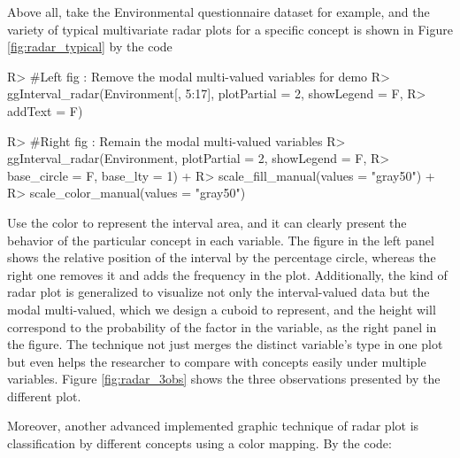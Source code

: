 \documentclass[article]{jss}
\begin{document}
Above all, take the Environmental questionnaire dataset for example, and the variety of typical multivariate radar plots for a specific concept is shown in Figure \ref{fig:radar_typical} by the code

\begin{CodeChunk}
\begin{CodeInput}
R> #Left fig : Remove the modal multi-valued variables for demo
R> ggInterval_radar(Environment[, 5:17], plotPartial = 2, showLegend = F, 
R>                  addText = F) 

R> #Right fig : Remain the modal multi-valued variables
R> ggInterval_radar(Environment, plotPartial = 2, showLegend = F,
R>                  base_circle = F, base_lty = 1) +
R>   scale_fill_manual(values = "gray50") +
R>   scale_color_manual(values = "gray50") 
\end{CodeInput}
\end{CodeChunk}

Use the color to represent the interval area, and it can clearly present the behavior of the particular concept in each variable. The figure in the left panel shows the relative position of the interval by the percentage circle, whereas the right one removes it and adds the frequency in the plot. Additionally, the kind of radar plot is generalized to visualize not only the interval-valued data but the modal multi-valued, which we design a cuboid to represent, and the height will correspond to the probability of the factor in the variable, as the right panel in the figure. The technique not just merges the distinct variable's type in one plot but even helps the researcher to compare with concepts easily under multiple variables. Figure \ref{fig:radar_3obs} shows the three observations presented by the different plot. 

Moreover, another advanced implemented graphic technique of radar plot is classification by different concepts using a color mapping. By the code:
\end{document}
